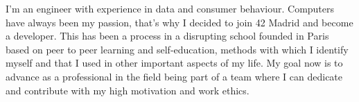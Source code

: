 
\begin{cvparagraph}
  I'm an engineer with experience in data and consumer behaviour. Computers have always been my passion, that's why I decided to join 42 Madrid and become a developer.
  This has been a process in a disrupting school founded in Paris based on peer to peer learning and self-education, methods with which I identify myself and that I used in other important aspects of my life.
  My goal now is to advance as a professional in the field being part of a team where I can dedicate and contribute with my high motivation and work ethics.
\end{cvparagraph}

